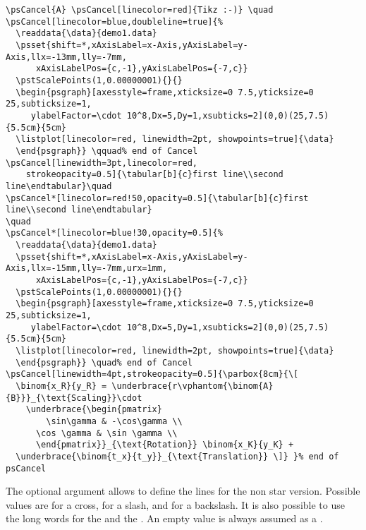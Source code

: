 \documentclass[11pt,english,BCOR10mm,DIV12,bibliography=totoc,parskip=false,smallheadings
    headexclude,footexclude,oneside]{pst-doc}
\begin{document}
\bigskip
\begin{lstlisting}
\psCancel{A} \psCancel[linecolor=red]{Tikz :-)} \quad
\psCancel[linecolor=blue,doubleline=true]{%
  \readdata{\data}{demo1.data}
  \psset{shift=*,xAxisLabel=x-Axis,yAxisLabel=y-Axis,llx=-13mm,lly=-7mm,
      xAxisLabelPos={c,-1},yAxisLabelPos={-7,c}}
  \pstScalePoints(1,0.00000001){}{}
  \begin{psgraph}[axesstyle=frame,xticksize=0 7.5,yticksize=0 25,subticksize=1,
     ylabelFactor=\cdot 10^8,Dx=5,Dy=1,xsubticks=2](0,0)(25,7.5){5.5cm}{5cm}
  \listplot[linecolor=red, linewidth=2pt, showpoints=true]{\data}
  \end{psgraph}} \qquad% end of Cancel
\psCancel[linewidth=3pt,linecolor=red,
    strokeopacity=0.5]{\tabular[b]{c}first line\\second line\endtabular}\quad
\psCancel*[linecolor=red!50,opacity=0.5]{\tabular[b]{c}first line\\second line\endtabular}
\quad
\psCancel*[linecolor=blue!30,opacity=0.5]{%
  \readdata{\data}{demo1.data}
  \psset{shift=*,xAxisLabel=x-Axis,yAxisLabel=y-Axis,llx=-15mm,lly=-7mm,urx=1mm,
      xAxisLabelPos={c,-1},yAxisLabelPos={-7,c}}
  \pstScalePoints(1,0.00000001){}{}
  \begin{psgraph}[axesstyle=frame,xticksize=0 7.5,yticksize=0 25,subticksize=1,
     ylabelFactor=\cdot 10^8,Dx=5,Dy=1,xsubticks=2](0,0)(25,7.5){5.5cm}{5cm}
  \listplot[linecolor=red, linewidth=2pt, showpoints=true]{\data}
  \end{psgraph}} \quad% end of Cancel
\psCancel[linewidth=4pt,strokeopacity=0.5]{\parbox{8cm}{\[
  \binom{x_R}{y_R} = \underbrace{r\vphantom{\binom{A}{B}}}_{\text{Scaling}}\cdot
    \underbrace{\begin{pmatrix}
        \sin\gamma & -\cos\gamma \\
      \cos \gamma & \sin \gamma \\
      \end{pmatrix}}_{\text{Rotation}} \binom{x_K}{y_K} +
  \underbrace{\binom{t_x}{t_y}}_{\text{Translation}} \]} }% end of psCancel
\end{lstlisting}

The optional argument  allows to define the lines for the non star version.
Possible values are  for a cross,  for a slash, and 
for a backslash. It is also possible to use the long words for the  and the .
An empty value is always assumed as a .

\begin{LTXexample}[pos=t,wide]
   \quad
{}\quad
{}\quad
{}
\end{LTXexample}
\end{document}
